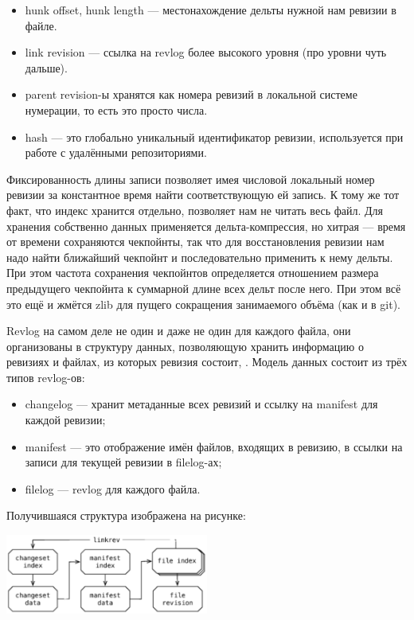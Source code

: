 \documentclass[a5paper]{article}
\begin{document}
\begin{itemize}
    \item hunk offset, hunk length --- местонахождение дельты нужной нам ревизии в файле. 
    \item link revision --- ссылка на revlog более высокого уровня (про уровни чуть дальше).
    \item parent revision-ы хранятся как номера ревизий в локальной системе нумерации, то есть это просто числа.
    \item hash --- это глобально уникальный идентификатор ревизии, используется при работе с удалёнными репозиториями.
\end{itemize}

Фиксированность длины записи позволяет имея числовой локальный номер ревизии за константное время найти соответствующую ей запись. К тому же тот факт, что индекс хранится отдельно, позволяет нам не читать весь файл. Для хранения собственно данных применяется дельта-компрессия, но хитрая --- время от времени сохраняются чекпойнты, так что для восстановления ревизии нам надо найти ближайший чекпойнт и последовательно применить к нему дельты. При этом частота сохранения чекпойнтов определяется отношением размера предыдущего чекпойнта к суммарной длине всех дельт после него. При этом всё это ещё и жмётся zlib для пущего сокращения занимаемого объёма (как и в git).

Revlog на самом деле не один и даже не один для каждого файла, они организованы в структуру данных, позволяющую хранить информацию о ревизиях и файлах, из которых ревизия состоит, . Модель данных состоит из трёх типов revlog-ов:

\begin{itemize}
    \item changelog --- хранит метаданные всех ревизий и ссылку на manifest для каждой ревизии;
    \item manifest --- это отображение имён файлов, входящих в ревизию, в ссылки на записи для текущей ревизии в filelog-ах;
    \item filelog --- revlog для каждого файла.
\end{itemize}

Получившаяся структура изображена на рисунке:

\begin{center}
    \includegraphics[width=0.5\textwidth]{mercurialLogStructure.png}
\end{center}
\end{document}
